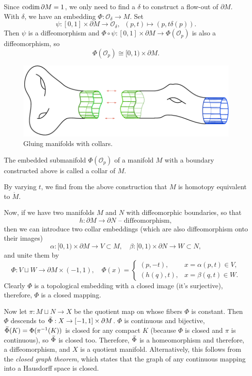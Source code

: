 Since $\operatorname{codim} \partial M=1$, we only need to find a $\delta$ to construct a flow-out of $\partial M$. With $\delta$, we have an embedding $\Phi:\mathcal{O}_\delta\to M$. Set 
\[\psi:[0,1]\times\partial M\to\mathcal{O}_\delta,\;\; (p,t)\mapsto (p,t\delta(p)).\]
Then $\psi$ is a diffeomorphism and $\Phi\circ\psi:[0,1]\times\partial M\to \Phi(\mathcal{O}_p)$ is also a diffeomorphism, so
\[\Phi(\mathcal{O}_p)\cong [0,1)\times\partial M.\]

\begin{figure}[tp]
    \centering
    \includegraphics[scale=0.2]{figures/collar.png}
    \caption{Gluing manifolds with collars.}
    \label{fig:collars}
\end{figure}

\begin{defn}[Collar]
    The embedded submanifold $\Phi(\mathcal{O}_p)$ of a manifold $M$ with a boundary constructed above is called a collar of $M$.
\end{defn}

\begin{cor}
    By varying $t$, we find from the above construction that $M$ is homotopy equivalent to $\mathring{M}$.
\end{cor}

Now, if we have two manifolds $M$ and $N$ with diffeomorphic boundaries, so that
\[h:\partial M\to \partial N\text{ -- diffeomorphism},\]
then we can introduce two collar embeddings (which are also diffeomorphism onto their images)
\[
\alpha:[0,1)\times\partial M\to V\subset M,\quad
\beta:[0,1)\times\partial N\to W\subset N,
\]
and unite them by
\[
\Phi: V\sqcup W\to \partial M\times (-1,1),\quad \Phi(x)=
\begin{cases}
(p,-t),& x=\alpha(p,t)\in V,\\
(h(q),t),& x=\beta(q,t)\in W.
\end{cases}
\]
Clearly $\Phi$  is a topological embedding with a closed image (it's surjective), therefore, $\Phi$ is a closed mapping.

Now let $\pi:M\sqcup N\to X$ be the quotient map on whose fibers $\Phi$ is constant. Then $\Phi$ descends to $\wt{\Phi}:X\to [-1,1]\times\partial M$. $\Phi$ is continuous and bijective, $\wt{\Phi}(K)=\Phi(\pi^{-1}(K))$ is closed for any compact $K$ (because $\Phi$ is closed and $\pi$ is continuous), so $\wt{\Phi}$ is closed too. Therefore, $\wt{\Phi}$ is a homeomorphism and therefore, a diffeomorphism, and $X$ is a quotient manifold. Alternatively, this follows from the \emph{closed graph theorem}, which states that the graph of any continuous mapping into a Hausdorff space is closed.

